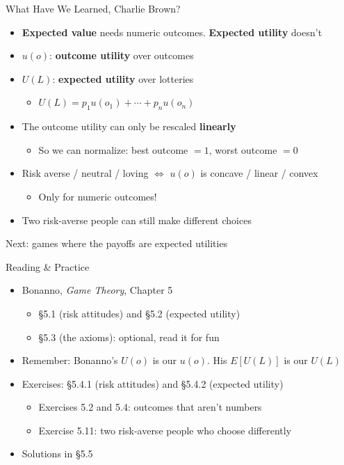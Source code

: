 \begin{frame}{What Have We Learned, Charlie Brown?}
\begin{itemize}
    \item \textbf{Expected value} needs numeric outcomes. \textbf{Expected utility} doesn't
    \item $u(o)$: \textbf{outcome utility} over outcomes
    \item $U(L)$: \textbf{expected utility} over lotteries
    \begin{itemize}
        \item $U(L)=p_1u(o_1)+\cdots+p_nu(o_n)$
    \end{itemize}
    \item The outcome utility can only be rescaled \textbf{linearly}
    \begin{itemize}
        \item So we can normalize: best outcome $=1$, worst outcome $=0$
    \end{itemize}
    \item Risk averse / neutral / loving $\iff$ $u(o)$ is concave / linear / convex
    \begin{itemize}
        \item Only for numeric outcomes!
    \end{itemize}
    \item Two risk-averse people can still make different choices
\end{itemize}
\vfill
Next: games where the payoffs are expected utilities
\vspace{-0.4in}
\end{frame}

\begin{frame}{Reading \& Practice}
\begin{itemize}
    \item Bonanno, \textit{Game Theory}, Chapter 5
    \begin{itemize}
        \item \S5.1 (risk attitudes) and \S5.2 (expected utility)
        \item \S5.3 (the axioms): optional, read it for fun
    \end{itemize}
    \item Remember: Bonanno's $U(o)$ is our $u(o)$. His $E[U(L)]$ is our $U(L)$
    \item Exercises: \S5.4.1 (risk attitudes) and \S5.4.2 (expected utility)
    \begin{itemize}
        \item Exercises 5.2 and 5.4: outcomes that aren't numbers
        \item Exercise 5.11: two risk-averse people who choose differently
    \end{itemize}
    \item Solutions in \S5.5
\end{itemize}
\vfill
\end{frame}


